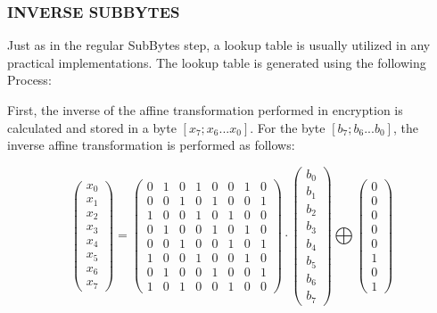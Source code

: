 \documentclass[12pt, a4paper]{report}
\theoremstyle{definition}
\theoremstyle{remark}
\begin{document}
\subsubsection{INVERSE SUBBYTES}
Just as in the regular SubBytes step, a lookup table is usually utilized in any practical implementations. The lookup table is generated using the following Process:

First, the inverse of the affine transformation performed in encryption is calculated and stored in a byte $[x_7;x_6...x_0]$. For the byte $[b_7;b_6...b_0]$, the inverse affine transformation is performed as follows:

\[ 
\left( \begin{array}{c}
x_0 \\
x_1 \\
x_2 \\
x_3 \\
x_4 \\
x_5 \\
x_6 \\
x_7\end{array} \right)
=
\left( \begin{array}{cccccccc}
0 & 1 & 0 & 1 & 0 & 0 & 1 & 0 \\
0 & 0 & 1 & 0 & 1 & 0 & 0 & 1 \\
1 & 0 & 0 & 1 & 0 & 1 & 0 & 0 \\
0 & 1 & 0 & 0 & 1 & 0 & 1 & 0 \\
0 & 0 & 1 & 0 & 0 & 1 & 0 & 1 \\
1 & 0 & 0 & 1 & 0 & 0 & 1 & 0 \\
0 & 1 & 0 & 0 & 1 & 0 & 0 & 1 \\
1 & 0 & 1 & 0 & 0 & 1 & 0 & 0\end{array} \right)
\cdot
\left( \begin{array}{c}
b_0 \\
b_1 \\
b_2 \\
b_3 \\
b_4 \\
b_5 \\
b_6 \\
b_7\end{array} \right)
\bigoplus
\left( \begin{array}{c}
0 \\
0 \\
0 \\
0 \\
0 \\
1 \\
0 \\
1\end{array} \right)
\]
\end{document}
